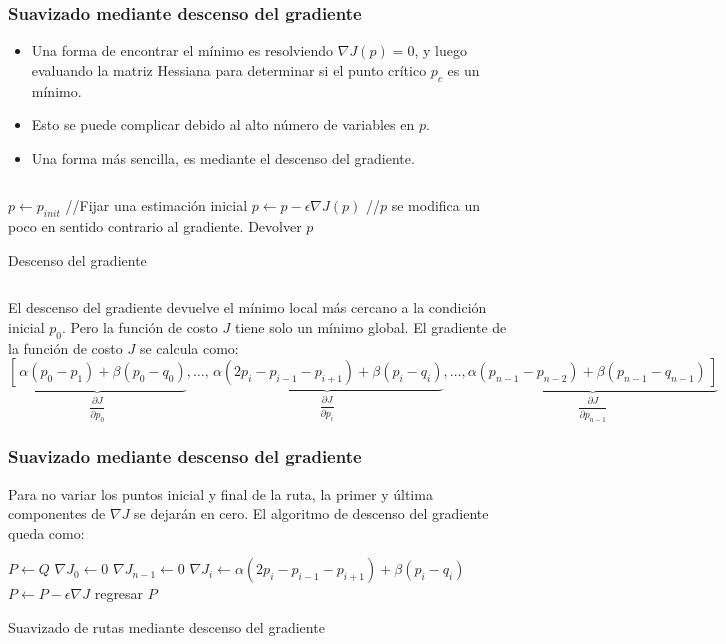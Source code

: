 \begin{frame}\frametitle{Suavizado mediante descenso del gradiente}
  \begin{itemize}
  \item Una forma de encontrar el mínimo es resolviendo $\nabla J(p) = 0$, y luego evaluando la matriz Hessiana para determinar si el punto crítico $p_c$ es un mínimo.
  \item Esto se puede complicar debido al alto número de variables en $p$.
  \item Una forma más sencilla, es mediante el descenso del gradiente.
  \end{itemize}
  \begin{columns}
    \begin{column}{0.7\textwidth}
  \begin{algorithm}[H]
    \footnotesize
  \DontPrintSemicolon
  $p\leftarrow p_{init}$ //Fijar una estimación inicial\;
  {
    $p \leftarrow p - \epsilon \nabla J (p)$ //$p$ se modifica un poco en sentido contrario al gradiente.\;
  }
  Devolver $p$
  \caption{Descenso del gradiente}
\end{algorithm}
\end{column}
\end{columns}
\[\]
El descenso del gradiente devuelve el mínimo local más cercano a la condición inicial $p_0$. Pero la función de costo $J$ tiene solo un mínimo global. El gradiente de la función de costo $J$ se calcula como:
  \[\underbrace{\left[\frac{}{}\alpha(p_0 - p_1)+\beta(p_0 - q_0)\right. }_{\dfrac{\partial J}{\partial p_0}}
,\dots ,
\underbrace{\frac{}{}\alpha(2p_i - p_{i-1} - p_{i+1})+\beta(p_i - q_i)}_{\dfrac{\partial J}{\partial p_i}}
,\dots ,
\underbrace{\left.\alpha(p_{n-1} - p_{n-2})+\beta(p_{n-1}-q_{n-1})\frac{}{}\right]}_{\dfrac{\partial J}{\partial p_{n-1}}}
\]
\end{frame}

\begin{frame}\frametitle{Suavizado mediante descenso del gradiente}
  
  Para no variar los puntos inicial y final de la ruta, la primer y última componentes de $\nabla J$ se dejarán en cero. El algoritmo de descenso del gradiente queda como:
  \[\]
\begin{algorithm}[H]
\DontPrintSemicolon
  \DontPrintSemicolon
  $P \leftarrow Q$\;
  $\nabla J_0 \leftarrow 0$\;
  $\nabla J_{n-1} \leftarrow 0$\;   
  {
    \ForEach{$i \in [1,n-1)$}
    {
      $\nabla J_i \leftarrow \alpha (2p_i - p_{i-1} - p_{i+1}) + \beta (p_i - q_i)$\;
    }
    $P \leftarrow P - \epsilon \nabla J$
  }
  regresar $P$
  \caption{Suavizado de rutas mediante descenso del gradiente}
\end{algorithm}
\end{frame}

